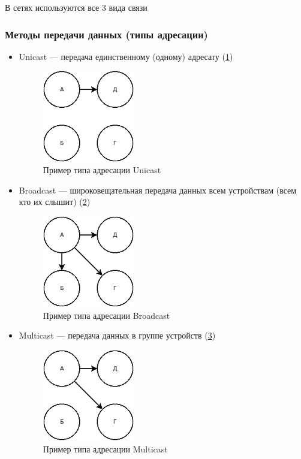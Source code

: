 \documentclass[a4paper]{article}
\begin{document}
В сетях используются все 3 вида связи

\subsubsection{Методы передачи данных (типы адресации)}
\begin{itemize}
	\item Unicast --- передача единственному (одному) адресату (\ref{fig:pic-4})
	\begin{figure}[!h]
		\centering
		\includegraphics[width=4cm]{4-unicast.png}
		\caption{Пример типа адресации Unicast}
		\label{fig:pic-4}
	\end{figure}
	\item Broadcast --- широковещательная передача данных всем устройствам (всем кто их слышит) (\ref{fig:pic-5})
	\begin{figure}[!h]
		\centering
		\includegraphics[width=4cm]{5-broadcast.png}
		\caption{Пример типа адресации Broadcast}
		\label{fig:pic-5}
	\end{figure}
	\item Multicast --- передача данных в группе устройств (\ref{fig:pic-6})
	\begin{figure}[!h]
		\centering
		\includegraphics[width=4cm]{6-multicast.png}
		\caption{Пример типа адресации Multicast}
		\label{fig:pic-6}
	\end{figure}
\end{itemize}
\end{document}

